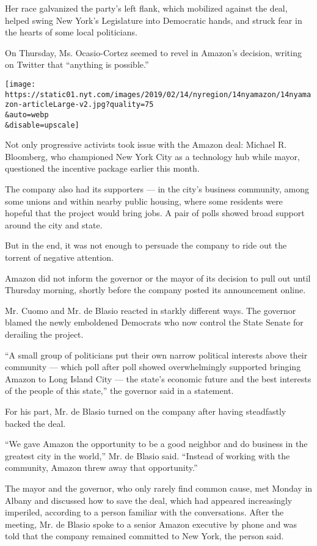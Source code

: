 Her race galvanized the party's left flank, which mobilized against the
deal, helped swing New York's Legislature into Democratic hands, and
struck fear in the hearts of some local politicians.

On Thursday, Ms. Ocasio-Cortez seemed to revel in Amazon's decision,
writing on Twitter that ``anything is possible.''

\texttt{[image: https://static01.nyt.com/images/2019/02/14/nyregion/14nyamazon/14nyamazon-articleLarge-v2.jpg?quality=75\\\&auto=webp\\\&disable=upscale]}

Not only progressive activists took issue with the Amazon deal: Michael
R. Bloomberg, who championed New York City as a technology hub while
mayor, questioned the incentive package earlier this month.

The company also had its supporters --- in the city's business
community, among some unions and within nearby public housing, where
some residents were hopeful that the project would bring jobs. A pair of
polls showed broad support around the city and state.

But in the end, it was not enough to persuade the company to ride out
the torrent of negative attention.

Amazon did not inform the governor or the mayor of its decision to pull
out until Thursday morning, shortly before the company posted its
announcement online.

Mr. Cuomo and Mr. de Blasio reacted in starkly different ways. The
governor blamed the newly emboldened Democrats who now control the State
Senate for derailing the project.

``A small group of politicians put their own narrow political interests
above their community --- which poll after poll showed overwhelmingly
supported bringing Amazon to Long Island City --- the state's economic
future and the best interests of the people of this state,'' the
governor said in a statement.

For his part, Mr. de Blasio turned on the company after having
steadfastly backed the deal.

``We gave Amazon the opportunity to be a good neighbor and do business
in the greatest city in the world,'' Mr. de Blasio said. ``Instead of
working with the community, Amazon threw away that opportunity.''

The mayor and the governor, who only rarely find common cause, met
Monday in Albany and discussed how to save the deal, which had appeared
increasingly imperiled, according to a person familiar with the
conversations. After the meeting, Mr. de Blasio spoke to a senior Amazon
executive by phone and was told that the company remained committed to
New York, the person said.

